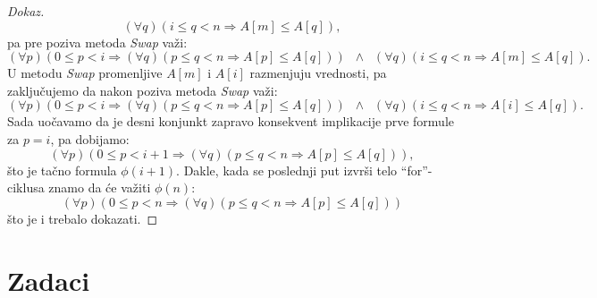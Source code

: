 \begin{proof}[Dokaz]
  $$
    (\forall q)(i \le q < n \Rightarrow A[m] \le A[q]),
  $$
  pa pre poziva metoda \textit{Swap} va\v zi:
  $$
    (\forall p)(0 \le p < i \Rightarrow (\forall q)(p \le q < n \Rightarrow A[p] \le A[q]))
    \;\;\land\;\;
    (\forall q)(i \le q < n \Rightarrow A[m] \le A[q]).
  $$
  U metodu \textit{Swap} promenljive $A[m]$ i $A[i]$ razmenjuju vrednosti, pa zaklju\v cujemo
  da nakon poziva metoda \textit{Swap} va\v zi:
  $$
    (\forall p)(0 \le p < i \Rightarrow (\forall q)(p \le q < n \Rightarrow A[p] \le A[q]))
    \;\;\land\;\;
    (\forall q)(i \le q < n \Rightarrow A[i] \le A[q]).
  $$
  Sada uo\v cavamo da je desni konjunkt zapravo konsekvent implikacije prve formule za $p = i$, pa dobijamo:
  $$
    (\forall p)(0 \le p < i + 1 \Rightarrow (\forall q)(p \le q < n \Rightarrow A[p] \le A[q])),
  $$
  \v sto je ta\v cno formula $\phi(i + 1)$.
  Dakle, kada se poslednji put izvr\v si telo \enquote{for}-ciklusa znamo da \'ce va\v ziti $\phi(n)$:
  $$
    (\forall p)(0 \le p < n \Rightarrow (\forall q)(p \le q < n \Rightarrow A[p] \le A[q]))
  $$
  \v sto je i trebalo dokazati.
\end{proof}

\section{Zadaci}



